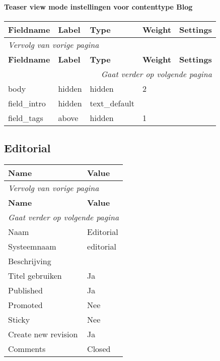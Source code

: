 \paragraph{Teaser view mode instellingen voor contenttype Blog }

  \begin{longtable}{| p{3.00cm}|p{3.00cm}|p{3.00cm}|p{3.00cm}|p{3.00cm}|}
  \hline
  \rowcolor{tableheader}
  \textbf{Fieldname} & \textbf{Label} & \textbf{Type} & \textbf{Weight} & \textbf{Settings}  \tabularnewline
  \hline
\endfirsthead
\multicolumn{5}{l}{\textit{Vervolg van vorige pagina}} \\
\hline
\rowcolor{tableheader}
  \textbf{Fieldname} & \textbf{Label} & \textbf{Type} & \textbf{Weight} & \textbf{Settings}  \tabularnewline
  \hline
\hline
\endhead
\multicolumn{5}{r}{\textit{Gaat verder op volgende pagina}} \\
\endfoot
\hline
\endlastfoot
  body & hidden & hidden & 2 &    \tabularnewline
  \hline
  field\_intro & hidden & text\_default &   &    \tabularnewline
  \hline
  field\_tags & above & hidden & 1 &    \tabularnewline
  \hline
  \end{longtable}

\subsection{Editorial}
\label{sec:content-editorial}
  \begin{longtable}{| p{7.50cm}|p{7.50cm}|}
  \hline
  \rowcolor{tableheader}
  \textbf{Name} & \textbf{Value}  \tabularnewline
  \hline
\endfirsthead
\multicolumn{2}{l}{\textit{Vervolg van vorige pagina}} \\
\hline
\rowcolor{tableheader}
  \textbf{Name} & \textbf{Value}  \tabularnewline
  \hline
\hline
\endhead
\multicolumn{2}{r}{\textit{Gaat verder op volgende pagina}} \\
\endfoot
\hline
\endlastfoot
  Naam & Editorial  \tabularnewline
  \hline
  Systeemnaam & editorial  \tabularnewline
  \hline
  Beschrijving &   \tabularnewline
  \hline
  Titel gebruiken & Ja  \tabularnewline
  \hline
  Published & Ja  \tabularnewline
  \hline
  Promoted & Nee  \tabularnewline
  \hline
  Sticky & Nee  \tabularnewline
  \hline
  Create new revision & Ja  \tabularnewline
  \hline
  Comments & Closed  \tabularnewline
  \hline
  \end{longtable}

